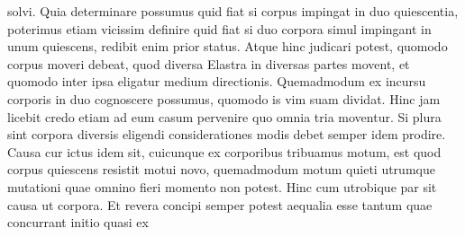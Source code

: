 %
%
solvi.
\pend
%
\pstart
Quia%
%
%
determinare possumus 
%
%
quid fiat si corpus impingat in duo
%
quiescentia,%
\protect{} poterimus etiam vicissim definire quid fiat si duo corpora simul impingant in unum quiescens,%
\protect{} redibit enim prior status.%
\protect{}
%
 Atque hinc judicari potest, quomodo corpus moveri debeat, quod diversa Elastra\protect{} in diversas partes movent, et quomodo inter ipsa eligatur medium directionis. Quemadmodum ex incursu corporis in duo\protect{} cognoscere possumus, quomodo is vim%
\protect{} suam dividat.
%
Hinc jam licebit credo etiam ad eum casum pervenire quo omnia tria moventur.  
%
Si plura sint corpora diversis eligendi considerationes modis debet semper idem prodire. 
\pend
%
\pstart Causa cur ictus\protect{} idem sit, cuicunque ex corporibus tribuamus motum, 
%
 est quod corpus quiescens resistit motui%
\protect{} novo, quemadmodum motum quieti%
\protect{} utrumque mutationi%
\protect{}  
%
%
quae omnino fieri momento non potest. Hinc cum utrobique par sit causa 
%
%
 ut corpora. Et revera concipi semper potest aequalia esse tantum quae concurrant initio quasi ex 
%
